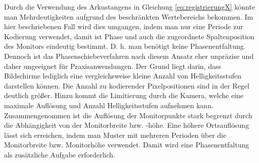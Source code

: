 \p
Durch die Verwendung des Arkustangens in Gleichung \ref{eq:registrierungX} könnte man Mehrdeutigkeiten aufgrund des beschränkten Wertebereichs bekommen.
Im hier beschriebenen Fall wird dies umgangen, indem man nur eine Periode zur Kodierung verwendet, damit ist Phase und auch die zugeordnete Spaltenposition des Monitors eindeutig bestimmt.
D. h. man benötigt keine Phasenentfaltung.
Dennoch ist das Phasenschiebeverfahren nach diesem Ansatz eher unpräzise und daher ungeeignet für Praxisanwendungen.
Der Grund liegt darin, dass Bildschirme lediglich eine vergleichsweise kleine Anzahl von Helligkeitsstufen darstellen können.
Die Anzahl zu kodierender Pixelpositionen sind in der Regel deutlich größer.
Hinzu kommt die Limitierung durch die Kamera, welche eine maximale Auflösung und Anzahl Helligkeitsstufen aufnehmen kann.
Zusammengenommen ist die Auflösung der Monitorpunkte stark begrenzt durch die Abhängigkeit von der Monitorbreite bzw. -höhe.
Eine höhere Ortsauflösung lässt sich erreichen, indem man Muster mit mehreren Perioden über die Monitorbreite bzw. Monitorhöhe verwendet.
Damit wird eine Phasenentfaltung als zusätzliche Aufgabe erforderlich.